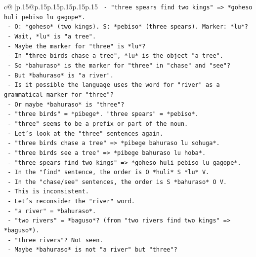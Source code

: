 \documentclass{article}
\begin{document}
{\begin{supertabular}{c@{$\;$}|p{.15\linewidth}@{}p{.15\linewidth}p{.15\linewidth}p{.15\linewidth}p{.15\linewidth}p{.15\linewidth}}
{{{\texttt{    {-}   "three spears find two kings" => *goheso huli pebiso lu gagope*.} \\
\texttt{        {-}   O: *goheso* (two kings). S: *pebiso* (three spears). Marker: *lu*?} \\
\texttt{        {-}   Wait, *lu* is "a tree".} \\
\texttt{        {-}   Maybe the marker for "three" is *lu*?} \\
\texttt{        {-}   In "three birds chase a tree", *lu* is the object "a tree".} \\
\texttt{        {-}   So *bahuraso* is the marker for "three" in "chase" and "see"?} \\
\texttt{        {-}   But *bahuraso* is "a river".} \\
\texttt{        {-}   Is it possible the language uses the word for "river" as a grammatical marker for "three"?} \\
\texttt{        {-}   Or maybe *bahuraso* is "three"?} \\
\texttt{        {-}   "three birds" = *pibege*. "three spears" = *pebiso*.} \\
\texttt{        {-}   "three" seems to be a prefix or part of the noun.} \\
\texttt{        {-}   Let's look at the "three" sentences again.} \\
\texttt{        {-}   "three birds chase a tree" => *pibege bahuraso lu sohuga*.} \\
\texttt{        {-}   "three birds see a tree" => *pibege bahuraso lu hoba*.} \\
\texttt{        {-}   "three spears find two kings" => *goheso huli pebiso lu gagope*.} \\
\texttt{        {-}   In the "find" sentence, the order is O *huli* S *lu* V.} \\
\texttt{        {-}   In the "chase/see" sentences, the order is S *bahuraso* O V.} \\
\texttt{        {-}   This is inconsistent.} \\
\texttt{        {-}   Let's reconsider the "river" word.} \\
\texttt{        {-}   "a river" = *bahuraso*.} \\
\texttt{        {-}   "two rivers" = *baguso*? (from "two rivers find two kings" => *baguso*).} \\
\texttt{        {-}   "three rivers"? Not seen.} \\
\texttt{        {-}   Maybe *bahuraso* is not "a river" but "three"?} \\
}}}
\end{supertabular}}
\end{document}
